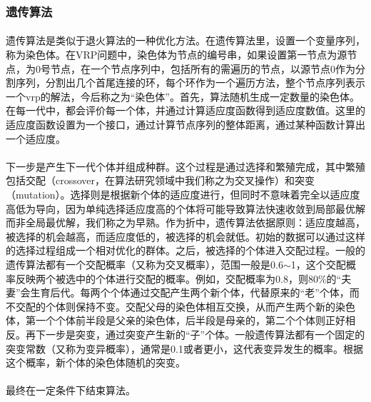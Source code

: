 \documentclass[UTF8,a4paper]{ctexart}
\begin{document}
\subsubsection{遗传算法\label{sec:ga}}
\paragraph{}遗传算法是类似于退火算法的一种优化方法。在遗传算法里，设置一个变量序列，称为染色体。在VRP问题中，染色体为节点的编号串，如果设置第一节点为源节点，为0号节点，在一个节点序列中，包括所有的需遍历的节点，以源节点0作为分割序列，分割出几个首尾连接的环，每个环作为一个遍历方法，整个节点序列表示一个vrp的解法，今后称之为“染色体”。首先，算法随机生成一定数量的染色体。在每一代中，都会评价每一个体，并通过计算适应度函数得到适应度数值。这里的适应度函数设置为一个接口，通过计算节点序列的整体距离，通过某种函数计算出一个适应度。

\paragraph{}下一步是产生下一代个体并组成种群。这个过程是通过选择和繁殖完成，其中繁殖包括交配（crossover，在算法研究领域中我们称之为交叉操作）和突变（mutation）。选择则是根据新个体的适应度进行，但同时不意味着完全以适应度高低为导向，因为单纯选择适应度高的个体将可能导致算法快速收敛到局部最优解而非全局最优解，我们称之为早熟。作为折中，遗传算法依据原则：适应度越高，被选择的机会越高，而适应度低的，被选择的机会就低。初始的数据可以通过这样的选择过程组成一个相对优化的群体。之后，被选择的个体进入交配过程。一般的遗传算法都有一个交配概率（又称为交叉概率），范围一般是0.6$\sim$1，这个交配概率反映两个被选中的个体进行交配的概率。例如，交配概率为0.8，则80\%的“夫妻”会生育后代。每两个个体通过交配产生两个新个体，代替原来的“老”个体，而不交配的个体则保持不变。交配父母的染色体相互交换，从而产生两个新的染色体，第一个个体前半段是父亲的染色体，后半段是母亲的，第二个个体则正好相反。再下一步是突变，通过突变产生新的“子”个体。一般遗传算法都有一个固定的突变常数（又称为变异概率），通常是0.1或者更小，这代表变异发生的概率。根据这个概率，新个体的染色体随机的突变。
\paragraph{}最终在一定条件下结束算法。
\end{document}
